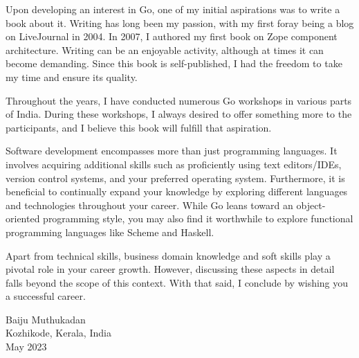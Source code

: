 Upon developing an interest in Go, one of my initial aspirations was to write a
book about it. Writing has long been my passion, with my first foray being a
blog on LiveJournal in 2004. In 2007, I authored my first book on Zope component
architecture. Writing can be an enjoyable activity, although at times it can
become demanding. Since this book is self-published, I had the freedom to take
my time and ensure its quality.

Throughout the years, I have conducted numerous Go workshops in various parts of
India. During these workshops, I always desired to offer something more to the
participants, and I believe this book will fulfill that aspiration.

Software development encompasses more than just programming languages. It
involves acquiring additional skills such as proficiently using text
editors/IDEs, version control systems, and your preferred operating system.
Furthermore, it is beneficial to continually expand your knowledge by exploring
different languages and technologies throughout your career. While Go leans
toward an object-oriented programming style, you may also find it worthwhile to
explore functional programming languages like Scheme and Haskell.

Apart from technical skills, business domain knowledge and soft skills play a
pivotal role in your career growth. However, discussing these aspects in detail
falls beyond the scope of this context. With that said, I conclude by wishing
you a successful career.

\thispagestyle{plain}

\vspace*{.2in}
Baiju Muthukadan\\
Kozhikode, Kerala, India\\
May 2023
